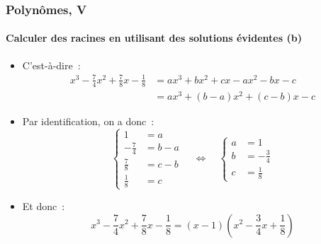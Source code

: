 \documentclass[10pt,notheorems]{beamer}
\theoremstyle{plain}
\theoremstyle{definition} %
\begin{document}
\begin{frame}
  \frametitle{Polynômes, V}
  \framesubtitle{Calculer des racines en utilisant des solutions évidentes (b)}
  \hypertarget{slide_polynome_2_racines_5_3}{}

  \bigskip

  \begin{itemize}

  \item C'est-à-dire~:
    \[
      \begin{split}
        x^3-\frac{7}{4}x^2+\frac{7}{8}x -\frac{1}{8} &= ax^3 + bx^2 + cx - ax^2 - bx - c\\
        &= ax^3 + (b-a)x^2 + (c-b)x -c
      \end{split}
    \]

  \item Par identification, on a donc~:
    \[
      \begin{cases}
        1 &= a\\
        -\frac{7}{4} &= b-a\\
        \frac{7}{8} &= c-b\\
        \frac{1}{8} &= c
      \end{cases}
      \quad
      \Leftrightarrow
      \quad
      \begin{cases}
        a &= 1\\
        b &= -\frac{3}{4}\\
        c &= \frac{1}{8}
      \end{cases}
    \]

  \item Et donc~:
    \[
      x^3-\frac{7}{4}x^2+\frac{7}{8}x -\frac{1}{8} = (x-1)\left(x^2-\frac{3}{4}x+\frac{1}{8}\right)
    \]

  \end{itemize}

\end{frame}
\end{document}
